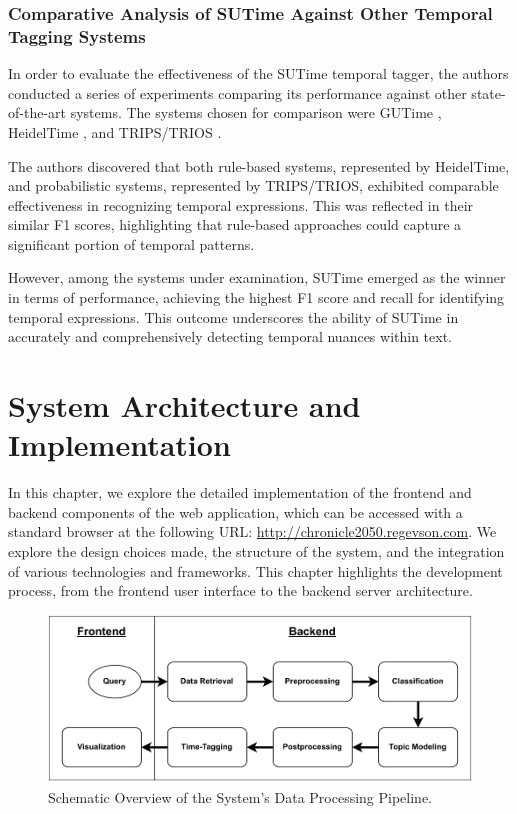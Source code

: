 \documentclass[12pt,oneside,bibtotoc,liststotoc]{scrbook}
\begin{document}
\subsection{Comparative Analysis of SUTime Against Other Temporal Tagging Systems}
In order to evaluate the effectiveness of the SUTime temporal tagger, the authors conducted a series of experiments comparing its performance against other state-of-the-art systems. The systems chosen for comparison were GUTime \cite{gutime}, HeidelTime \cite{heideltime}, and TRIPS/TRIOS \cite{trips}.

The authors discovered that both rule-based systems, represented by HeidelTime, and probabilistic systems, represented by TRIPS/TRIOS, exhibited comparable effectiveness in recognizing temporal expressions. This was reflected in their similar F1 scores, highlighting that rule-based approaches could capture a significant portion of temporal patterns.

However, among the systems under examination, SUTime emerged as the winner in terms of performance, achieving the highest F1 score and recall for identifying temporal expressions. \cite{sutime} This outcome underscores the ability of SUTime in accurately and comprehensively detecting temporal nuances within text.


\chapter{System Architecture and Implementation}
In this chapter, we explore the detailed implementation of the frontend and backend components of the web application, which can be accessed with a standard browser at the following URL: \url{http://chronicle2050.regevson.com}. We explore the design choices made, the structure of the system, and the integration of various technologies and frameworks. This chapter highlights the development process, from the frontend user interface to the backend server architecture.

\begin{figure}[H]
\centering
\includegraphics[width=13cm]{img/system.pdf}
\caption{Schematic Overview of the System's Data Processing Pipeline.}
\label{fig:archi}
\end{figure}
\end{document}
